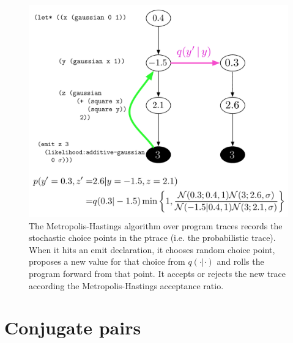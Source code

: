 \documentclass{article}
\begin{document}
\begin{figure}
\includegraphics[width=\textwidth]{figures/ptrace.pdf}
\caption{The Metropolis-Hastings algorithm over program traces records the
stochastic choice points in the ptrace (i.e. the probabilistic trace). When it
hits an emit declaration, it chooses random choice point, proposes a new
value for that choice from $q(\cdot | \cdot)$ and rolls the program forward from
that point. It accepts or rejects the new trace according the
Metropolis-Hastings acceptance ratio.} \label{fig:ptrace}
\end{figure}

\section{Conjugate pairs}






\end{document}
